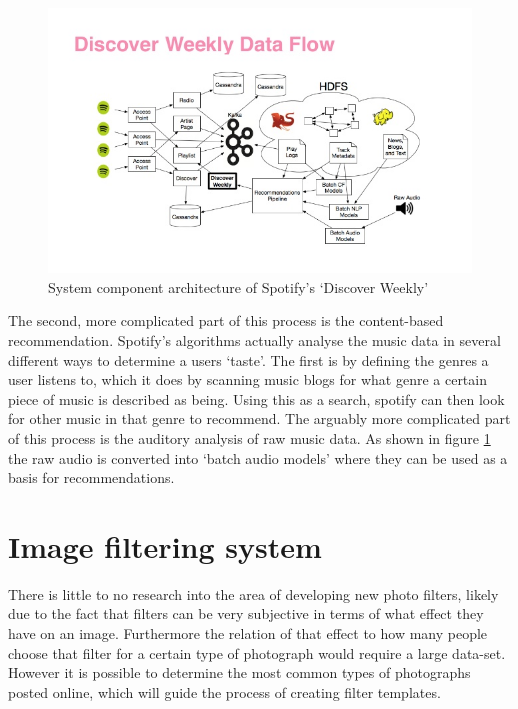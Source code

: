 \documentclass[a4paper,12pt]{report}
\begin{document}
        \begin{figure}[ht]
          \centering
          \includegraphics[width=\linewidth]{discoverweekly-dataflow}
          \caption[System component architecture of Spotify's ‘Discover Weekly’]{System component architecture of Spotify's ‘Discover Weekly’ \protect\citep{johnson2015dw}}
          \label{fig:discoverweekly-dataflow}
        \end{figure}

        The second, more complicated part of this process is the content-based recommendation. Spotify's algorithms actually analyse the music data in several different ways to determine a users ‘taste’. The first is by defining the genres a user listens to, which it does by scanning music blogs for what genre a certain piece of music is described as being. Using this as a search, spotify can then look for other music in that genre to recommend. The arguably more complicated part of this process is the auditory analysis of raw music data. As shown in figure \ref{fig:discoverweekly-dataflow} the raw audio is converted into ‘batch audio models’ where they can be used as a basis for recommendations.


  \section{Image filtering system}
    There is little to no research into the area of developing new photo filters, likely due to the fact that filters can be very subjective in terms of what effect they have on an image. Furthermore the relation of that effect to how many people choose that filter for a certain type of photograph would require a large data-set. However it is possible to determine the most common types of photographs posted online, which will guide the process of creating filter templates.
\end{document}
